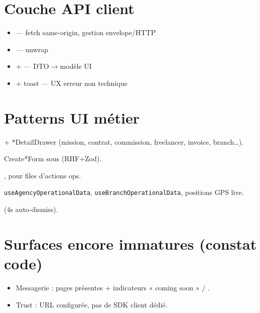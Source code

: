 \section{Couche API client}

\begin{itemize}
  \item {} --- fetch same-origin, gestion envelope/HTTP
  \item {} --- unwrap
  \item {} +  --- DTO$\rightarrow$modèle UI
  \item {} + toast --- UX erreur non technique
\end{itemize}


\section{Patterns UI métier}

\begin{description}[style=nextline]
  \item[Drawers]
     + *DetailDrawer (mission, contrat,
    commission, freelancer, invoice, branch\ldots).
  \item[Forms]
    Create*Form sous  (RHF+Zod).
  \item[Action queues]
    , 
    pour files d'actions ops.
  \item[Hooks data]
    \texttt{useAgencyOperationalData}, \texttt{useBranchOperationalData},
    positions GPS live.
  \item[Toast]
     (4s auto-dismiss).
\end{description}

\section{Surfaces encore immatures (constat code)}

\begin{itemize}
  \item Messagerie : pages présentes + indicateurs « coming soon » /
        .
  \item Trust : URL configurée, pas de SDK client dédié.
\end{itemize}
